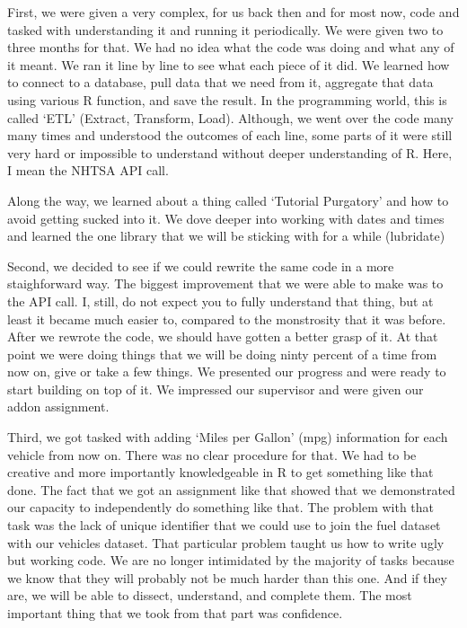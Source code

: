 \documentclass[]{book}
\begin{document}
First, we were given a very complex, for us back then and for most now, code and tasked with understanding it and running it periodically. We were given two to three months for that. We had no idea what the code was doing and what any of it meant. We ran it line by line to see what each piece of it did. We learned how to connect to a database, pull data that we need from it, aggregate that data using various R function, and save the result. In the programming world, this is called `ETL' (Extract, Transform, Load). Although, we went over the code many many times and understood the outcomes of each line, some parts of it were still very hard or impossible to understand without deeper understanding of R. Here, I mean the NHTSA API call.

Along the way, we learned about a thing called `Tutorial Purgatory' and how to avoid getting sucked into it. We dove deeper into working with dates and times and learned the one library that we will be sticking with for a while (lubridate)

Second, we decided to see if we could rewrite the same code in a more staighforward way. The biggest improvement that we were able to make was to the API call. I, still, do not expect you to fully understand that thing, but at least it became much easier to, compared to the monstrosity that it was before. After we rewrote the code, we should have gotten a better grasp of it. At that point we were doing things that we will be doing ninty percent of a time from now on, give or take a few things. We presented our progress and were ready to start building on top of it. We impressed our supervisor and were given our addon assignment.

Third, we got tasked with adding `Miles per Gallon' (mpg) information for each vehicle from now on. There was no clear procedure for that. We had to be creative and more importantly knowledgeable in R to get something like that done. The fact that we got an assignment like that showed that we demonstrated our capacity to independently do something like that. The problem with that task was the lack of unique identifier that we could use to join the fuel dataset with our vehicles dataset. That particular problem taught us how to write ugly but working code. We are no longer intimidated by the majority of tasks because we know that they will probably not be much harder than this one. And if they are, we will be able to dissect, understand, and complete them. The most important thing that we took from that part was confidence.
\end{document}

